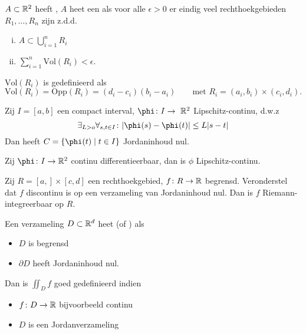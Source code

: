 \documentclass{2wa40summary}
\newcommand\ds{\displaystyle}
\begin{document}
		\begin{define}
			$ A \subset \mathbb{R}^2 $ heeft , $A$ heet een  als voor alle $ \epsilon > 0 $ er eindig veel rechthoekgebieden $ R_1, \ldots, R_n $ zijn z.d.d.
			\begin{enumerate}[(i)]
				\item $ A \subset \ds\bigcup_{i=1}^n R_i $
				\item $ \ds\sum_{i=1}^n \text{Vol}(R_i) < \epsilon $.
			\end{enumerate}
			$ \text{Vol}(R_i) $ is gedefinieerd als 
			\[ 
				\text{Vol}(R_i)=\text{Opp}(R_i) = (d_i-c_i)(b_i-a_i) \qquad \text{met } R_i = (a_i,b_i) \times (c_i,d_i). 
			\]	 
		\end{define}
		
	    \begin{theorem}
	    	Zij $ I=[a,b] $ een compact interval, $ \phi \: I \to~\reals^2 $ Lipschitz-continu, d.w.z
	    	\[ 
		    	\exists_{L>o} \forall_{s,t \in I} \: \abs{\phi (s) - \phi (t)} \leq L \abs{s-t} 
	    	 \]
	    	 Dan heeft $ C = \set{\phi (t) \mid t \in I} $ Jordaninhoud nul.
	    \end{theorem}
	    
	    \begin{opm}
	    	Zij $ \phi \: I \to \reals^2 $ continu differentieerbaar, dan is $\phi$ Lipschitz-continu.
	    \end{opm}
	    
	    \begin{theorem}[\text{[K] 11.3.3}]
	    	Zij $ R=[a,] \times [c,d] $ een rechthoekgebied, $ f \colon R \to \mathbb{R} $ begrensd. Veronderstel dat $f$ discontinu is op een verzameling van Jordaninhoud nul. Dan is $f$ Riemann-integreerbaar op $R$.
	    \end{theorem}
	    
	    \begin{define}
	    	Een verzameling $ D \subset \mathbb{R}^d $ heet  (of ) als 
	    	\begin{itemize}
	    		\item $D$ is begrensd
	    		\item $\partial D$ heeft Jordaninhoud nul.
	    	\end{itemize}
	    	Dan is $ \iint_D f $ goed gedefinieerd indien  
	    	\begin{itemize}
	    		\item $ f \colon D \to \mathbb{R} $ bijvoorbeeld continu 
	    		\item $D$ is een Jordanverzameling
	    	\end{itemize}
	    \end{define}
	    
\end{document}
